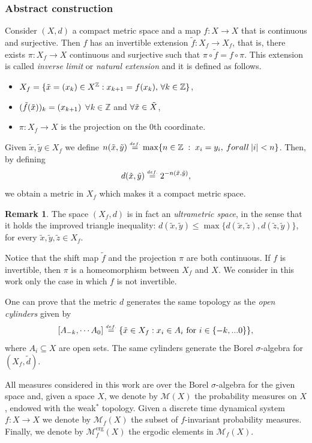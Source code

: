 \documentclass[a4paper,11pt,reqno]{amsart}
\newcommand{\Z}{{\mathbb Z}}
\newcommand{\cM}{{\mathcal M}}
\newcommand{\eqdef}{\stackrel{\scriptscriptstyle\textrm def.}{=}}
\newcommand{\tix}{\tilde{x}}
\theoremstyle{definition}
\newtheorem{remark}{Remark}
\begin{document}
\subsubsection{Abstract construction}
Consider $(X, d)$ a compact metric space and a map $f: X \to X$ that is continuous and surjective. Then $f$ has an invertible extension $\tilde{f}: X_f \to X_f$, that is, there exists $\pi: X_f \to X$ continuous and surjective such that $\pi \circ \tilde{f} = f \circ \pi$. This extension is called \textit{inverse limit} or \textit{natural extension} and it is defined as follows.
\begin{itemize}
    \item $X_f = \{\Tilde{x} = (x_k) \in X^\mathbb{Z}: x_{k+1} = f(x_k) \mbox{, } \forall k \in \mathbb{Z}\}$,
    \item $(\Tilde{f}(\Tilde{x}))_k = (x_{k+1})$ $\forall k \in \mathbb{Z}$ and $\forall \Tilde{x} \in \Tilde{X}$,
    \item $\pi: X_f \to X$ is the projection on the 0th coordinate.
\end{itemize}

Given $\tix,\tilde{y}\in X_f$ we define $n(\tix,\tilde{y}) \eqdef \max \{n\in\Z\; : \; x_i=y_i,\:\textrm{for all}\:|i|<n\}$. Then, by defining
\[
d(\tix,\tilde{y})\eqdef 2^{-n(\tix,\tilde{y})},
\]
we obtain a metric in $X_f$ which makes it a compact metric space. 
\begin{remark}
    \label{lem:ultramen}
The space $(X_f,d)$ is in fact an \emph{ultrametric space}, in the sense that it holds the improved triangle inequality: $d(\tix,\tilde{y})\leq\max\{d(\tix,\tilde{z}),d(\tilde{z},\tilde{y})\}$, for every $\tix,\tilde{y},\tilde{z}\in X_f$. 
\end{remark}

Notice that the shift map $\tilde{f}$ and the projection $\pi$ are both continuous. If $f$ is invertible, then $\pi$ is a homeomorphism between $X_f$ and $X$. We consider in this work only the case in which $f$ is not invertible.

One can prove that the metric $d$ generates the same topology as the \textit{open cylinders} given by
$$[A_{-k}, \cdots A_0] \eqdef \{\tilde{x} \in X_f : x_i \in A_i \mbox{ for } i \in \{-k,...0\} \},$$
where $A_i \subseteq X$ are open sets. The same cylinders generate the Borel $\sigma$-algebra for $(X_f, \tilde{d})$. 

All measures considered in this work are over the Borel $\sigma$-algebra for the given space and, given a space $X$, we denote by $\cM(X)$ the probability measures on $X$, endowed with the weak$^*$ topology. Given a discrete time dynamical system $f:X\to X$ we denote by $\cM_f(X)$ the subset of $f$-invariant probability measures. Finally, we denote by $\cM^{\operatorname{erg}}_f(X)$ the ergodic elements in $\cM_f(X)$.  
\end{document}
